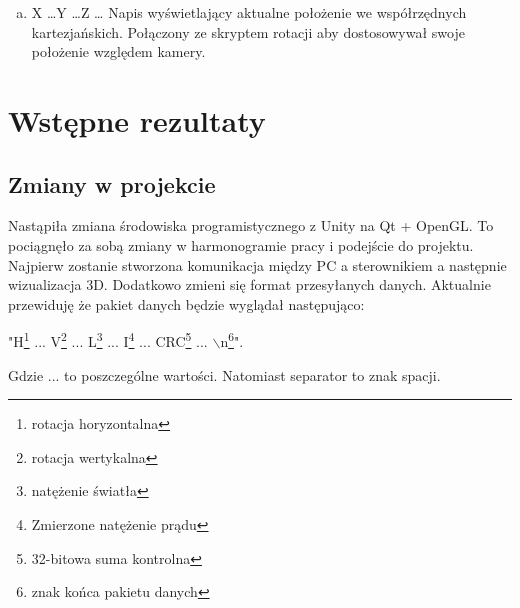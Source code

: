 \documentclass[10pt, a4paper]{article}
\begin{document}
\begin{enumerate}[I.]
\begin{enumerate}[a)]
				\item X \dots Y \dots Z \dots
				\newline	
				Napis wyświetlający aktualne położenie we współrzędnych kartezjańskich. Połączony ze skryptem rotacji aby dostosowywał swoje położenie względem kamery.
			\end{enumerate}
		\end{enumerate}
			
\newpage
\section{Wstępne rezultaty}
		\subsection{Zmiany w projekcie}
		Nastąpiła zmiana środowiska programistycznego z Unity na Qt + OpenGL. To pociągnęło za sobą zmiany w harmonogramie pracy i podejście do projektu. Najpierw zostanie stworzona komunikacja między PC a sterownikiem a następnie wizualizacja 3D. Dodatkowo zmieni się format przesyłanych danych. Aktualnie przewiduję że pakiet danych będzie wyglądał następująco: 
		\begin{center}
			"H\footnote{rotacja horyzontalna} ... V\footnote{rotacja wertykalna} ... L\footnote{natężenie światła} ... I\footnote{Zmierzone natężenie prądu} ... CRC\footnote{32-bitowa suma kontrolna} ... $\backslash$n\footnote{znak końca pakietu danych}".
		\end{center}
		Gdzie ... to poszczególne wartości. Natomiast separator to znak spacji.
		
\end{document}

